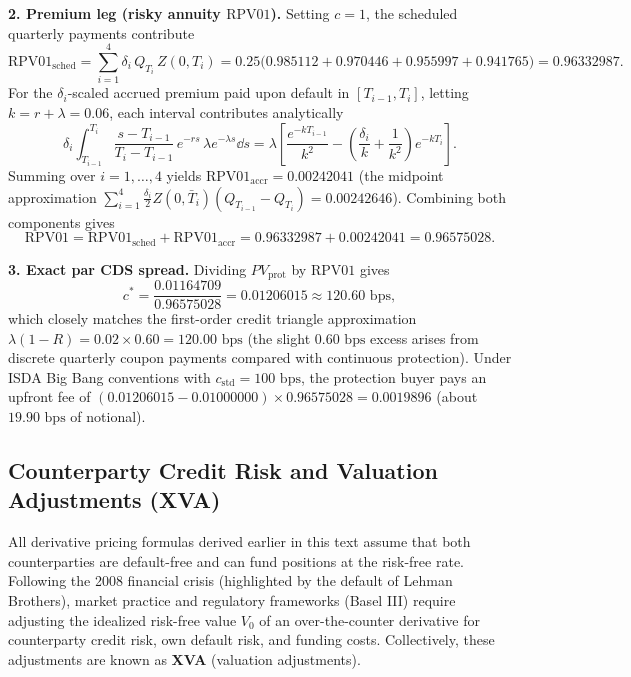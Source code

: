 \begin{example}
    \textbf{2. Premium leg (risky annuity $\mathrm{RPV01}$).} Setting $c = 1$, the scheduled quarterly payments contribute
    \[
    \mathrm{RPV01}_{\mathrm{sched}} = \sum_{i=1}^4 \delta_i\,Q_{T_i}\,Z(0, T_i) = 0.25\bigl(0.985112 + 0.970446 + 0.955997 + 0.941765\bigr) = 0.96332987.
    \]
    For the $\delta_i$-scaled accrued premium paid upon default in $[T_{i-1}, T_i]$, letting $k = r + \lambda = 0.06$, each interval contributes analytically
    \[
    \delta_i \int_{T_{i-1}}^{T_i} \frac{s - T_{i-1}}{T_i - T_{i-1}}\,e^{-rs}\,\lambda e^{-\lambda s}\dd s
    = \lambda\left[\frac{e^{-k T_{i-1}}}{k^2} - \left(\frac{\delta_i}{k} + \frac{1}{k^2}\right)e^{-k T_i}\right].
    \]
    Summing over $i = 1, \ldots, 4$ yields $\mathrm{RPV01}_{\mathrm{accr}} = 0.00242041$ (the midpoint approximation $\sum_{i=1}^4 \frac{\delta_i}{2} Z(0, \bar{T}_i)(Q_{T_{i-1}} - Q_{T_i}) = 0.00242646$). Combining both components gives
    \[
    \mathrm{RPV01} = \mathrm{RPV01}_{\mathrm{sched}} + \mathrm{RPV01}_{\mathrm{accr}} = 0.96332987 + 0.00242041 = 0.96575028.
    \]

    \textbf{3. Exact par CDS spread.} Dividing $PV_{\text{prot}}$ by $\mathrm{RPV01}$ gives
    \[
    c^* = \frac{0.01164709}{0.96575028} = 0.01206015 \approx 120.60\text{ bps},
    \]
    which closely matches the first-order credit triangle approximation $\lambda(1 - R) = 0.02 \times 0.60 = 120.00\text{ bps}$ (the slight $0.60\text{ bps}$ excess arises from discrete quarterly coupon payments compared with continuous protection). Under ISDA Big Bang conventions with $c_{\mathrm{std}} = 100\text{ bps}$, the protection buyer pays an upfront fee of $(0.01206015 - 0.01000000) \times 0.96575028 = 0.0019896$ (about $19.90\text{ bps}$ of notional).
\end{example}

\subsection*{Counterparty Credit Risk and Valuation Adjustments (XVA)}
All derivative pricing formulas derived earlier in this text assume that both counterparties are default-free and can fund positions at the risk-free rate. Following the 2008 financial crisis (highlighted by the default of Lehman Brothers), market practice and regulatory frameworks (Basel III) require adjusting the idealized risk-free value $V_0$ of an over-the-counter derivative for counterparty credit risk, own default risk, and funding costs. Collectively, these adjustments are known as \textbf{XVA} (valuation adjustments).


